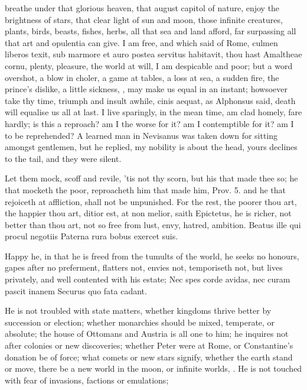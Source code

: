 {breathe under that glorious heaven, that august capitol of nature,
enjoy the brightness of stars, that clear light of sun and moon, those
infinite creatures, plants, birds, beasts, fishes, herbs, all that sea
and land afford, far surpassing all that art and opulentia can give. I
am free, and which \Seneca said of Rome, culmen liberos texit, sub
marmore et auro postea servitus habitavit, thou hast Amaltheae cornu,
plenty, pleasure, the world at will, I am despicable and poor; but a
word overshot, a blow in choler, a game at tables, a loss at sea, a
sudden fire, the prince's dislike, a little sickness, \etc{}, may make us
equal in an instant; howsoever take thy time, triumph and insult
awhile, cinis aequat, as Alphonsus said, death will equalise us
all at last. I live sparingly, in the mean time, am clad homely, fare
hardly; is this a reproach? am I the worse for it? am I contemptible
for it? am I to be reprehended? A learned man in  Nevisanus was
taken down for sitting amongst gentlemen, but he replied, my nobility
is about the head, yours declines to the tail, and they were silent.

Let them mock, scoff and revile, 'tis not thy scorn, but his that made
thee so; he that mocketh the poor, reproacheth him that made him, Prov.
 5. and he that rejoiceth at affliction, shall not be unpunished.
For the rest, the poorer thou art, the happier thou art, ditior est, at
non melior, saith Epictetus, he is richer, not better than thou
art, not so free from lust, envy, hatred, ambition.
Beatus ille qui procul negotiis
Paterna rura bobus exercet suis.

Happy he, in that he is freed from the tumults of the world, he
seeks no honours, gapes after no preferment, flatters not, envies not,
temporiseth not, but lives privately, and well contented with his
estate;
Nec spes corde avidas, nec curam pascit inanem
Securus quo fata cadant.

He is not troubled with state matters, whether kingdoms thrive better
by succession or election; whether monarchies should be mixed,
temperate, or absolute; the house of Ottomans and Austria is all one to
him; he inquires not after colonies or new discoveries; whether Peter
were at Rome, or Constantine's donation be of force; what comets or new
stars signify, whether the earth stand or move, there be a new world in
the moon, or infinite worlds, \etc{}. He is not touched with fear of
invasions, factions or emulations;

}
